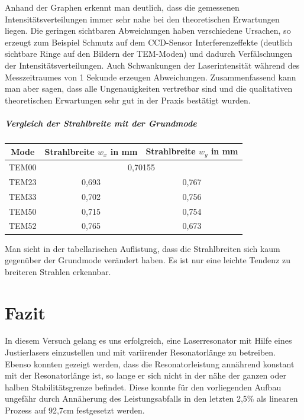 \documentclass[bigchapter,colorback,accentcolor=tud4b,linedtoc,11pt]{tudreport}
\numberwithin{equation}{subsection}
\begin{document}
\FloatBarrier
Anhand der Graphen erkennt man deutlich, dass die gemessenen Intensitätsverteilungen immer sehr nahe bei den theoretischen Erwartungen liegen. Die geringen sichtbaren Abweichungen haben verschiedene Ursachen, so erzeugt zum Beispiel Schmutz auf dem CCD-Sensor Interferenzeffekte (deutlich sichtbare Ringe auf den Bildern der TEM-Moden) und dadurch Verfälschungen der Intensitätsverteilungen. Auch Schwankungen der Laserintensität während des Messzeitraumes von 1 Sekunde erzeugen Abweichungen. Zusammenfassend kann man aber sagen, dass alle Ungenauigkeiten vertretbar sind und die qualitativen theoretischen Erwartungen sehr gut in der Praxis bestätigt wurden.

\paragraph{Vergleich der Strahlbreite mit der Grundmode}

\begin{center}
	\begin{tabular}{c|c|c}
        Mode & Strahlbreite $w_x$ in mm & Strahlbreite $w_y$ in mm \\ \hline
        TEM00 & \multicolumn{2}{c}{0,70155} \\ 
        TEM23 & 0,693 & 0,767 \\
        TEM33 & 0,702 & 0,756 \\
        TEM50 & 0,715 & 0,754 \\
        TEM52 & 0,765 & 0,673 
	\end{tabular}
\end{center}

Man sieht in der tabellarischen Auflistung, dass die Strahlbreiten sich kaum gegenüber der Grundmode verändert haben. Es ist nur eine leichte Tendenz zu breiteren Strahlen erkennbar.
 
\chapter{Fazit}
In diesem Versuch gelang es uns erfolgreich, eine Laserresonator mit Hilfe eines Justierlasers einzustellen und mit variirender Resonatorlänge zu betreiben. Ebenso konnten gezeigt werden, dass die Resonatorleistung annährend konstant mit der Resonatorlänge ist, so lange er sich nicht in der nähe der ganzen oder halben Stabilitätsgrenze befindet. Diese konnte für den vorliegenden Aufbau ungefähr durch Annäherung des Leistungsabfalls in den letzten 2,5\% als linearen Prozess auf 92,7cm festgesetzt werden.
\end{document}

